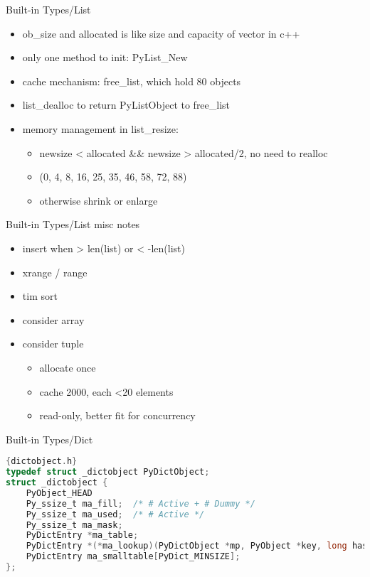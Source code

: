 \documentclass[xcolor=svgnames]{beamer}
\begin{document}
\begin{frame}{Built-in Types/List}
\begin{itemize} 
  \item ob\_size and allocated is like size and capacity of vector in c++
  \item only one method to init: PyList\_New
  \item cache mechanism: free\_list, which hold 80 objects
  \item list\_dealloc to return PyListObject to free\_list
  \item memory management in list\_resize:
    \begin{itemize} 
        \item newsize < allocated \&\& newsize > allocated/2, no need to realloc
        \item (0, 4, 8, 16, 25, 35, 46, 58, 72, 88)
        \item otherwise shrink or enlarge
    \end{itemize} 
\end{itemize} 
\end{frame}

\begin{frame}{Built-in Types/List}
misc notes
\begin{itemize} 
    \item insert when > len(list) or < -len(list)
    \item xrange / range
    \item tim sort
    \item consider array
    \item consider tuple
        \begin{itemize} 
            \item allocate once
            \item cache 2000, each <20 elements
            \item read-only, better fit for concurrency
        \end{itemize} 
\end{itemize} 
\end{frame}

\begin{frame}[fragile]{Built-in Types/Dict}
\begin{lstlisting}[language=C]{dictobject.h}
typedef struct _dictobject PyDictObject;
struct _dictobject {
    PyObject_HEAD
    Py_ssize_t ma_fill;  /* # Active + # Dummy */
    Py_ssize_t ma_used;  /* # Active */
    Py_ssize_t ma_mask;
    PyDictEntry *ma_table;
    PyDictEntry *(*ma_lookup)(PyDictObject *mp, PyObject *key, long hash);
    PyDictEntry ma_smalltable[PyDict_MINSIZE];
};
\end{lstlisting} 
\end{frame}
\end{document}
